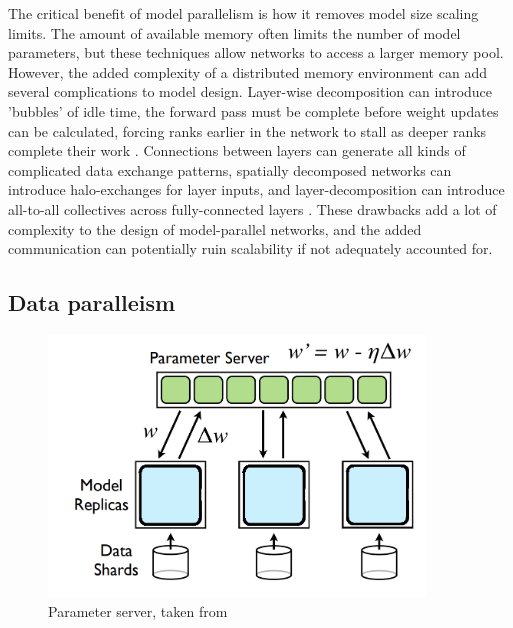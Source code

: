 The critical benefit of model parallelism is how it removes model size scaling limits.
The amount of available memory often limits the number of model parameters, but these techniques allow networks to access a larger memory pool.
However, the added complexity of a distributed memory environment can add several complications to model design. 
Layer-wise decomposition can introduce 'bubbles' of idle time, the forward pass must be complete before weight updates can be calculated, forcing ranks earlier in the network to stall as deeper ranks complete their work \cite{Huang2019Gpipe}.
Connections between layers can generate all kinds of complicated data exchange patterns, spatially decomposed networks can introduce halo-exchanges for layer inputs, and layer-decomposition can introduce all-to-all collectives across fully-connected layers \cite{Coates2013DLwithCOTSHPC, Dryden2019ImprvScaleofCNN}.
These drawbacks add a lot of complexity to the design of model-parallel networks, and the added communication can potentially ruin scalability if not adequately accounted for.

\subsection{Data paralleism}
\begin{figure}
    \centering
    \includegraphics[width=10cm]{3_Chapters/3_Chapter_DistributedDL/Figs/parameter_server.png}
    \caption{Parameter server, taken from \cite{Dean2012DistBelif}}
    \label{fig:parameter-server}
\end{figure}

